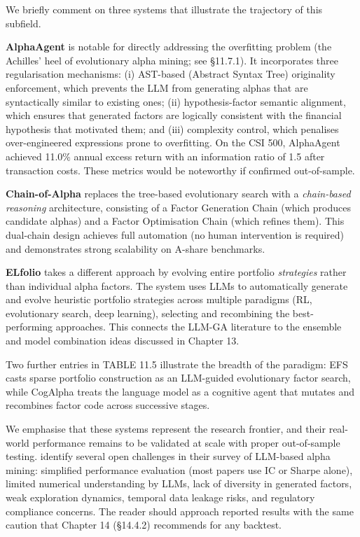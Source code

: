 \bigskip

We briefly comment on three systems that illustrate the trajectory of this subfield.

\textbf{AlphaAgent} \citep{tang2025alphaagent} is notable for directly addressing the overfitting problem (the Achilles' heel of evolutionary alpha mining; see §11.7.1). It incorporates three regularisation mechanisms: (i) AST-based (Abstract Syntax Tree) originality enforcement, which prevents the LLM from generating alphas that are syntactically similar to existing ones; (ii) hypothesis-factor semantic alignment, which ensures that generated factors are logically consistent with the financial hypothesis that motivated them; and (iii) complexity control, which penalises over-engineered expressions prone to overfitting. On the CSI 500, AlphaAgent achieved 11.0\% annual excess return with an information ratio of 1.5 after transaction costs. These metrics would be noteworthy if confirmed out-of-sample.

\textbf{Chain-of-Alpha} \citep{Cao2025} replaces the tree-based evolutionary search with a \textit{chain-based reasoning} architecture, consisting of a Factor Generation Chain (which produces candidate alphas) and a Factor Optimisation Chain (which refines them). This dual-chain design achieves full automation (no human intervention is required) and demonstrates strong scalability on A-share benchmarks.

\textbf{ELfolio} \citep{ZengX2025} takes a different approach by evolving entire portfolio \textit{strategies} rather than individual alpha factors. The system uses LLMs to automatically generate and evolve heuristic portfolio strategies across multiple paradigms (RL, evolutionary search, deep learning), selecting and recombining the best-performing approaches. This connects the LLM-GA literature to the ensemble and model combination ideas discussed in Chapter 13.

Two further entries in TABLE 11.5 illustrate the breadth of the paradigm: EFS \citep{Luo2025} casts sparse portfolio construction as an LLM-guided evolutionary factor search, while CogAlpha \citep{LiuF2025} treats the language model as a cognitive agent that mutates and recombines factor code across successive stages.

We emphasise that these systems represent the research frontier, and their real-world performance remains to be validated at scale with proper out-of-sample testing. \cite{ZhangJ2025} identify several open challenges in their survey of LLM-based alpha mining: simplified performance evaluation (most papers use IC or Sharpe alone), limited numerical understanding by LLMs, lack of diversity in generated factors, weak exploration dynamics, temporal data leakage risks, and regulatory compliance concerns. The reader should approach reported results with the same caution that Chapter 14 (§14.4.2) recommends for any backtest.

